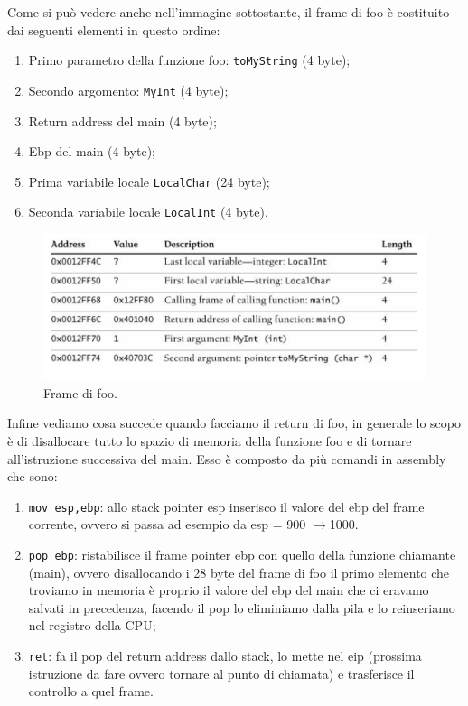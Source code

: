 Come si può vedere anche nell'immagine sottostante, il frame di foo è costituito dai seguenti elementi in questo ordine:
\begin{enumerate}
    \item Primo parametro della funzione foo: \verb|toMyString| (4 byte);
    \item Secondo argomento: \verb|MyInt| (4 byte);
    \item Return address del main (4 byte);
    \item Ebp del main (4 byte);
    \item Prima variabile locale \verb|LocalChar| (24 byte);
    \item Seconda variabile locale \verb|LocalInt|  (4 byte).
\end{enumerate}
\begin{figure}[H]
	\centering
    \includegraphics[width=14cm, keepaspectratio]{santini/img/cap_2/diss_stack.png}
	\caption{Frame di foo.}\label{fig:frame_foo}
\end{figure}
Infine vediamo cosa succede quando facciamo il return di foo, in generale lo scopo è di disallocare tutto lo spazio di memoria della funzione foo e di tornare all'istruzione successiva del main. Esso è composto da più comandi in assembly che sono:
\begin{enumerate}
    \item \verb|mov esp,ebp|: allo stack pointer esp inserisco il valore del ebp del frame corrente, ovvero si passa ad esempio da esp = 900 $\xrightarrow{}$1000.
    \item \verb|pop ebp|: ristabilisce il frame pointer ebp con quello della funzione chiamante (main), ovvero disallocando i 28 byte del frame di foo il primo elemento che troviamo in memoria è proprio il valore del ebp del main che ci eravamo salvati in precedenza, facendo il pop lo eliminiamo dalla pila e lo reinseriamo nel registro della CPU;
    \item \verb|ret|: fa il pop del return address dallo stack, lo mette nel eip (prossima istruzione da fare ovvero tornare al punto di chiamata) e trasferisce il controllo a quel frame.
\end{enumerate}
